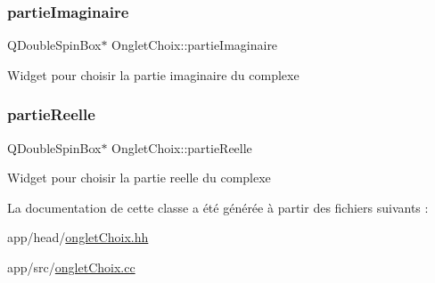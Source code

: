 \subsubsection{\texorpdfstring{partie\+Imaginaire}{partieImaginaire}}
{\footnotesize\ttfamily Q\+Double\+Spin\+Box$\ast$ Onglet\+Choix\+::partie\+Imaginaire\hspace{0.3cm}{\ttfamily [private]}}

Widget pour choisir la partie imaginaire du complexe \mbox{\label{classOngletChoix_aaa7381931138a3b546b87c40351422be}} 
\subsubsection{\texorpdfstring{partie\+Reelle}{partieReelle}}
{\footnotesize\ttfamily Q\+Double\+Spin\+Box$\ast$ Onglet\+Choix\+::partie\+Reelle\hspace{0.3cm}{\ttfamily [private]}}

Widget pour choisir la partie reelle du complexe 

La documentation de cette classe a été générée à partir des fichiers suivants \+:\begin{DoxyCompactItemize}
\item 
app/head/\hyperlink{ongletChoix_8hh}{onglet\+Choix.\+hh}\item 
app/src/\hyperlink{ongletChoix_8cc}{onglet\+Choix.\+cc}\end{DoxyCompactItemize}
